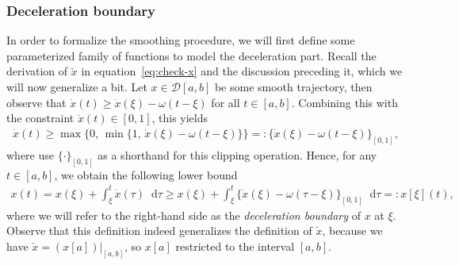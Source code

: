 \documentclass[a4paper]{article}
\theoremstyle{definition}
\theoremstyle{plain}
\newcommand*\diff{\mathop{}\!\mathrm{d}}
\begin{document}
\subsubsection{Deceleration boundary}
In order to formalize the smoothing procedure, we will first define some
parameterized family of functions to model the deceleration part.
%
Recall the derivation of $\check{x}$ in equation~\eqref{eq:check-x} and the discussion
preceding it, which we will now generalize a bit.
%
Let $x \in \mathcal{D}[a, b]$ be some smooth trajectory, then observe that $\dot{x}(t) \geq \dot{x}(\xi) - \omega(t - \xi)$ for all $t \in [a, b]$.
Combining this with the constraint $\dot{x}(t) \in [0, 1]$, this yields
\begin{align}
  \dot{x}(t) \geq \max\{ 0, \, \min\{1, \, \dot{x}(\xi) - \omega (t - \xi) \}\} =: \{\dot{x}(\xi) - \omega(t-\xi)\}_{[0,1]} ,
\end{align}
where use $\{ \cdot \}_{[0,1]}$ as a shorthand for this clipping operation.
%
Hence, for any $t \in [a,b]$, we obtain the following lower bound
\begin{align}\label{eq:deceleration-boundary}
  x(t) = x(\xi) + \int_{\xi}^{t} \dot{x}(\tau) \diff \tau \geq x(\xi) + \int_{\xi}^{t} \{\dot{x}(\xi) - \omega(\tau - \xi)\}_{[0,1]} \diff \tau =: x[\xi] (t) ,
\end{align}
where we will refer to the right-hand side as the \emph{deceleration boundary} of $x$
at $\xi$.
%
Observe that this definition indeed generalizes the definition of $\check{x}$,
because we have $\check{x}=(x[a])|_{[a,b]}$, so $x[a]$ restricted to the
interval $[a,b]$.
\end{document}
